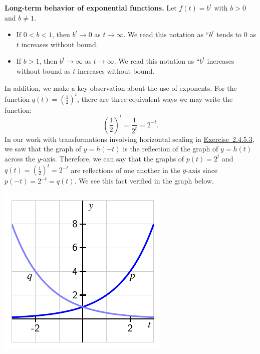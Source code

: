 \documentclass[nooutcomes]{ximera}
\begin{document}
\begin{callout}
\textbf{\Large Long-term behavior of exponential functions.}
Let \(f(t) = b^t\) with \(b \gt 0\) and \(b \ne 1\).
\begin{itemize}
\item If \(0 \lt b \lt 1\), then \(b^t \to 0\) as \(t \to \infty\).  We read this notation as ``\(b^t\) tends to \(0\) as \(t\) increases without bound.
\item If \(b \gt 1\), then \(b^t \to \infty\) as \(t \to \infty\).  We read this notation as ``\(b^t\) increases without bound as \(t\) increases without bound.
\end{itemize}
\end{callout}

In addition, we make a key observation about the use of exponents.  For the function \(q(t) = \left(\frac{1}{2}\right)^t\), there are three equivalent ways we may write the function:%
\begin{equation*}
\left( \frac{1}{2} \right)^t = \frac{1}{2^t} = 2^{-t}\text{.}
\end{equation*}
In our work with transformations involving horizontal scaling in \hyperlink{ez-circular-sinusoidal-horiz-reflection}{Exercise~2.4.5.3}, we saw that the graph of \(y = h(-t)\) is the reflection of the graph of \(y = h(t)\) across the \(y\)-axis.  Therefore, we can say that the graphs of \(p(t) = 2^t\) and \(q(t) = \left(\frac{1}{2}\right)^t = 2^{-t}\) are reflections of one another in the \(y\)-axis since \(p(-t) = 2^{-t} = q(t)\).  We see this fact verified in the graph below.

\begin{image}
\includegraphics{modeling-exp-reflection}
\end{image}
\end{document}
